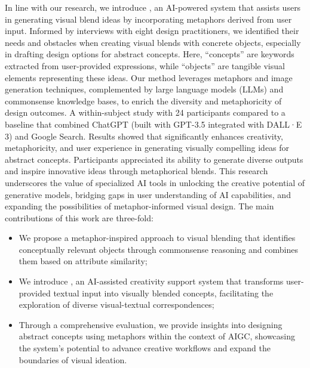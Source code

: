 In line with our research, we introduce \sysname, an AI-powered system that assists users in generating visual blend ideas by incorporating metaphors derived from user input.
Informed by interviews with eight design practitioners, we identified their needs and obstacles when creating visual blends with concrete objects, especially in drafting design options for abstract concepts.
Here, ``concepts'' are keywords extracted from user-provided expressions, while ``objects'' are tangible visual elements representing these ideas.
Our method leverages metaphors and image generation techniques, complemented by large language models (LLMs) and commonsense knowledge bases, to enrich the diversity and metaphoricity of design outcomes.
A within-subject study with 24 participants compared \sysname{} to a baseline that combined ChatGPT (built with GPT-3.5 integrated with DALL·E 3) and Google Search.
Results showed that \sysname{} significantly enhances creativity, metaphoricity, and user experience in generating visually compelling ideas for abstract concepts.
Participants appreciated its ability to generate diverse outputs and inspire innovative ideas through metaphorical blends.
This research underscores the value of specialized AI tools in unlocking the creative potential of generative models, bridging gaps in user understanding of AI capabilities, and expanding the possibilities of metaphor-informed visual design.
The main contributions of this work are three-fold:
\begin{itemize}[leftmargin=*]
    \item We propose a metaphor-inspired approach to visual blending that identifies conceptually relevant objects through commonsense reasoning and combines them based on attribute similarity; 
    \item We introduce \sysname, an AI-assisted creativity support system that transforms user-provided textual input into visually blended concepts, facilitating the exploration of diverse visual-textual correspondences;
    \item Through a comprehensive evaluation, we provide insights into designing abstract concepts using metaphors within the context of AIGC, showcasing the system’s potential to advance creative workflows and expand the boundaries of visual ideation.
\end{itemize}



